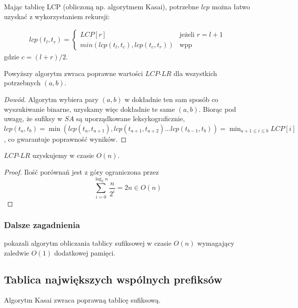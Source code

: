 Mając tablicę LCP (obliczoną np. algorytmem Kasai), potrzebne $lcp$ można łatwo uzyskać z wykorzystaniem rekursji:

\begin{align*}
   lcp(t_l, t_r) = 
   \begin{cases}
        LCP[r] & \text{jeżeli } r = l + 1 \\
        min(lcp(t_l, t_c), lcp(t_c, t_r)) & \text{wpp}
   \end{cases}
\end{align*} 
gdzie $c = (l + r) / 2$.

\begin{theorem}{}{}
Powyższy algorytm zwraca poprawne wartości $LCP\textrm{-}LR$ dla wszystkich potrzebnych $(a, b)$.
\end{theorem}

\begin{proof}[Dowód]
Algorytm wybiera pary $(a, b)$ w dokładnie ten sam sposób co wyszukiwanie binarne, uzyskamy więc dokładnie te same $(a, b)$. Biorąc pod uwagę, że sufiksy w $SA$ są uporządkowane leksykograficznie, $lcp(t_a, t_b) = \min(lcp(t_a, t_{a + 1}), \allowbreak lcp(t_{a + 1}, t_{a + 2}) \ldots \allowbreak lcp(t_{b-1}, t_{b}))= \min_{a + 1 \leq i \leq b} LCP[i] $, co gwarantuje poprawność wyników.
\end{proof}

\begin{theorem}{}{}
$LCP\textrm{-}LR$ uzyskujemy w czasie $O(n)$.
\end{theorem}

\begin{proof}
Ilość porównań jest z góry ograniczona przez $$\sum_{i=0}^{\log_2{n}} \frac{n}{2^i} = 2n \in O(n)$$
\end{proof}


\subsubsection{Dalsze zagadnienia}

\citet{li2018optimal} pokazali algorytm obliczania tablicy sufiksowej w czasie $O(n)$ wymagający zaledwie $O(1)$ dodatkowej pamięci.

\subsection{Tablica największych wspólnych prefiksów}


\begin{theorem}{}{}
  Algorytm Kasai zwraca poprawną tablicę sufiksową.
\end{theorem}


